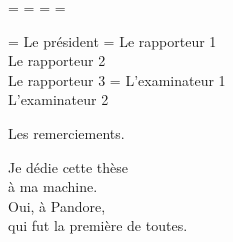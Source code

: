 \documentclass{thesul}
\begin{document}
      \OddHead={{\leftmark\rightmark}{\hfil\slshape\rightmark}}
      \EvenHead={{\leftmark}{{\slshape\leftmark}\hfil}}
      \OddFoot={\hfil\thepage}
      \EvenFoot={\thepage\hfil}
      \pagestyle{ThesisHeadingsII}


\ResetChaptersAtParts 




\MasterUL
{}
\President    = {Le pr\'esident}
\Rapporteurs  = {Le rapporteur 1\\
                 Le rapporteur 2\\
                 Le rapporteur 3}
\Examinateurs = {L'examinateur 1\\
                 L'examinateur 2}

\MakeThesisTitlePage



\begin{ThesisAcknowledgments}
Les remerciements.
\end{ThesisAcknowledgments}


\begin{ThesisDedication}
Je dédie cette thèse\\
à ma machine.\\
Oui, à Pandore,\\
qui fut la première de toutes.
\end{ThesisDedication}


\end{document}
